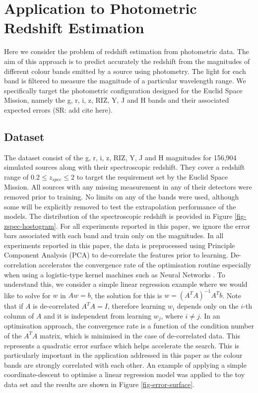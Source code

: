 \documentclass[useAMS,usenatbib,fleqn]{mn2e}
\begin{document}
\section{Application to Photometric Redshift Estimation}
\label{sec-application}

Here we consider the problem of redshift estimation from photometric data. The aim of this approach is to predict accurately the redshift from the magnitudes of different colour bands emitted by a source using photometry. The light for each band is filtered to measure the magnitude of a particular wavelength range. We specifically target the photometric configuration designed for the Euclid Space Mission, namely the g, r, i, z, RIZ, Y, J and H bands and their associated expected errors (SR: add cite here).

\subsection{Dataset}
\label{sec-dataset}

The dataset consist of the g, r, i, z, RIZ, Y, J and H magnitudes for 156,904 simulated sources along with their spectroscopic redshift. They cover a redshift range of $0.2 \le z_{spec} \le 2$ to target the requirement set by the Euclid Space Mission. All sources with any missing measurement in any of their detectors were removed prior to training. No limits on any of the bands were used, although some will be explicitly removed to test the extrapolation performance of the models. The distribution of the spectroscopic redshift is provided in Figure \ref{fig-zspec-hostogram}. For all experiments reported in this paper, we ignore the error bars associated with each band and train only on the magnitudes. In all experiments reported in this paper, the data is preprocessed using Principle Component Analysis (PCA) \citep{jolliffe1986} to de-correlate the features prior to learning. De-correlation accelerates the convergence rate of the optimisation routine especially when using a logistic-type kernel machines such as Neural Networks \citep{lecun1998}. To understand this, we consider a simple linear regression example where we would like to solve for $w$ in $Aw=b$, the solution for this is $w=\left(A^{T}A\right)^{-1}A^{T}b$. Note that if $A$ is de-correlated $A^{T}A=I$, therefore learning $w_{i}$ depends only on the $i$-th column of $A$ and it is independent from learning $w_{j}$, where $i\ne j$. In an optimisation approach, the convergence rate is a function of the condition number of the $A^{T}A$ matrix, which is minimised in the case of de-correlated data. This represents a quadratic error surface which helps accelerate the search. This is particularly important in the application addressed in this paper as the colour bands are strongly correlated with each other. An example of applying a simple coordinate-descent to optimise a linear regression model was applied to the toy data set and the results are shown in Figure \ref{fig-error-surface}.
\end{document}
